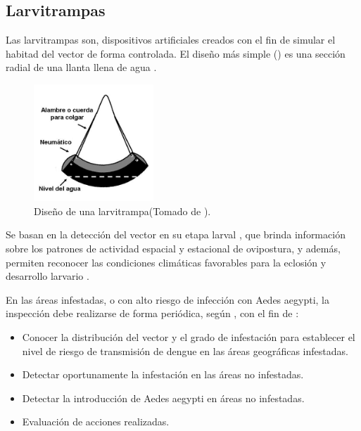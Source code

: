 \subsection{Larvitrampas}
\label{sec:densidad-vectorial-larvitrampas}
Las larvitrampas son, dispositivos artificiales creados con el fin de simular el habitad del
vector de forma controlada. El diseño más simple () es una sección
radial de una llanta llena de agua \cite{world2009dengue}.

\begin{figure}[!htbp]
\centering
\includegraphics[width=0.4\textwidth]{capitulo-3/graphics/larvitrampa.png}
\caption{\label{fig:cap3-larvitrampas} Diseño de una larvitrampa(Tomado de
\cite{manualControlArg2009}).}
\end{figure}

Se basan en la detección del vector en su etapa larval
\cite{manualControlArg2009, MARQUES1993}, que brinda información sobre los patrones de actividad
espacial y estacional de ovipostura, y además, permiten reconocer las condiciones climáticas
favorables para la eclosión y desarrollo larvario \cite{manualControlArg2009}.

En las áreas infestadas, o con alto riesgo de infección con Aedes aegypti, la inspección debe
realizarse de forma periódica, según \cite{manualControlArg2009}, con el fin de :

\begin{itemize}
    \item Conocer la distribución del vector y el grado de infestación para establecer el nivel de riesgo de transmisión de dengue en las áreas geográficas infestadas.
    \item Detectar oportunamente la infestación en las áreas no infestadas.
    \item Detectar la introducción de Aedes aegypti en áreas no infestadas.
    \item Evaluación de acciones realizadas.
\end{itemize}

